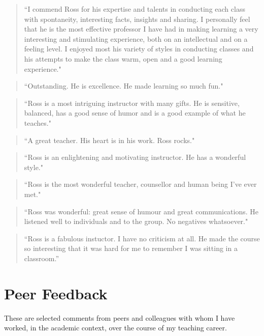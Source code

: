 \documentclass[10pt,DIV09,letterpaper,oneside,headsepline]{scrreprt}
\begin{document}
\begin{quote} ``I commend Ross for his expertise and talents in conducting each class with spontaneity, interesting facts, insights and sharing. I personally feel that he is the most effective professor I have had in making learning a very interesting and stimulating experience, both on an intellectual and on a feeling level. I enjoyed most his variety of styles in conducting classes and his attempts to make the class warm, open and a good learning experience." \end{quote}

\begin{quote} ``Outstanding. He is excellence. He made learning so much fun." \end{quote}

\begin{quote} ``Ross is a most intriguing instructor with many gifts. He is sensitive, balanced, has a good sense of humor and is a good example of what he teaches." \end{quote}

\begin{quote} ``A great teacher. His heart is in his work. Ross rocks." \end{quote}

\begin{quote} ``Ross is an enlightening and motivating instructor. He has a wonderful style." \end{quote}

\begin{quote} ``Ross is the most wonderful teacher, counsellor and human being I've ever met." \end{quote}

\begin{quote} ``Ross was wonderful: great sense of humour and great communications. He listened well to individuals and to the group. No negatives whatsoever." \end{quote}

\begin{quote} ``Ross is a fabulous instuctor. I have no criticism at all. He made the course so interesting that it was hard for me to remember I was sitting in a classroom.'' \end{quote}

\chapter{Peer Feedback}
These are selected comments from peers and colleagues with whom I have worked, in the academic context, over the course of my teaching career.
\end{document}
